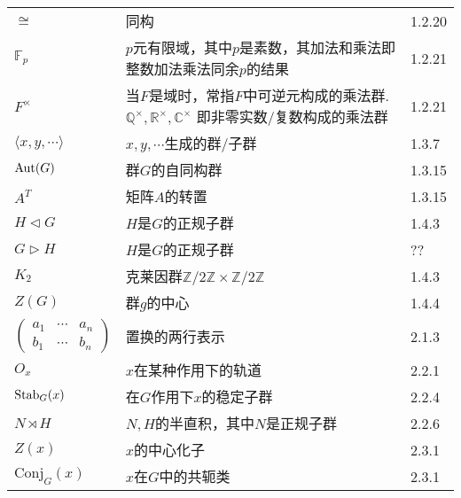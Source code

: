 \begin{longtable}{lp{.6\linewidth}l}
	$\cong$ & 同构 & 1.2.20\\
	$\mathbb{F}_p$ & $p$元有限域，其中$p$是素数，其加法和乘法即整数加法乘法同余$p$的结果 & 1.2.21\\
	$F^{\times}$ & 当$F$是域时，常指$F$中可逆元构成的乘法群. $\mathbb{Q}^{\times}, \mathbb{R}^{\times}, \mathbb{C}^{\times}$ 即非零实数/复数构成的乘法群 & 1.2.21\\
	$\langle x,y,\cdots \rangle$ & $x,y,\cdots$生成的群/子群 & 1.3.7\\
	$\operatorname{Aut}(G)$ & 群$G$的自同构群 & 1.3.15\\
	$A^T$ & 矩阵$A$的转置 & 1.3.15\\
	$H\vartriangleleft G$ & $H$是$G$的正规子群 & 1.4.3\\
	$G\vartriangleright H$ & $H$是$G$的正规子群 & ??\\
	$K_2$ & 克莱因群$\mathbb{Z}/2\mathbb{Z}\times\mathbb{Z}/2\mathbb{Z}$ & 1.4.3\\
	$Z(G)$ & 群$g$的中心 & 1.4.4\\
	$\begin{pmatrix}
		a_1 & \cdots & a_n\\
		b_1 & \cdots & b_n
	\end{pmatrix}$ & 置换的两行表示 & 2.1.3\\
	$O_x$ & $x$在某种作用下的轨道 & 2.2.1\\
	$\operatorname{Stab}_G(x)$ & 在$G$作用下$x$的稳定子群 & 2.2.4\\
	$N\rtimes H$ & $N,H$的半直积，其中$N$是正规子群 & 2.2.6\\
	$Z(x)$ & $x$的中心化子& 2.3.1\\
	$\mathrm{Conj}_G(x)$ & $x$在$G$中的共轭类 & 2.3.1\\
\end{longtable}
